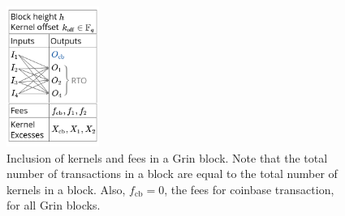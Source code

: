 \begin{figure}[h!]
  \includegraphics[width=0.27\textwidth]{Figures/block2.png}
  \centering
  \caption{Inclusion of kernels and fees in a Grin block. Note that the total number of transactions in a block are equal to the total number of kernels in a block.
  Also, $f_{\text{cb}} = 0$, the fees for coinbase transaction, for all Grin blocks.}
  \label{fig:kernels}
\end{figure}

